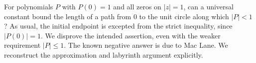 For polynomials $P$ with $P(0)=1$ and all zeros on $|z|=1$, can a universal constant bound the length of a path from $0$ to the unit circle along which $|P|<1$? As usual, the initial endpoint is excepted from the strict inequality, since $|P(0)|=1$. We disprove the intended assertion, even with the weaker requirement $|P|\le1$. The known negative answer is due to Mac Lane. We reconstruct the approximation and labyrinth argument explicitly.

